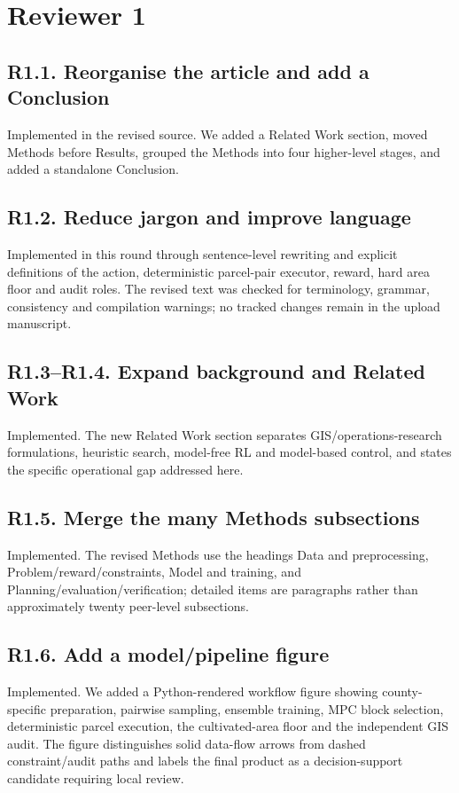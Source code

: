 ﻿\documentclass[11pt]{article}
\begin{document}
\section*{Reviewer 1}
\subsection*{R1.1. Reorganise the article and add a Conclusion}
Implemented in the revised source. We added a Related Work section, moved Methods before Results, grouped the Methods into four higher-level stages, and added a standalone Conclusion.

\subsection*{R1.2. Reduce jargon and improve language}
Implemented in this round through sentence-level rewriting and explicit definitions of the action, deterministic parcel-pair executor, reward, hard area floor and audit roles. The revised text was checked for terminology, grammar, consistency and compilation warnings; no tracked changes remain in the upload manuscript.

\subsection*{R1.3--R1.4. Expand background and Related Work}
Implemented. The new Related Work section separates GIS/operations-research formulations, heuristic search, model-free RL and model-based control, and states the specific operational gap addressed here.

\subsection*{R1.5. Merge the many Methods subsections}
Implemented. The revised Methods use the headings Data and preprocessing, Problem/reward/constraints, Model and training, and Planning/evaluation/verification; detailed items are paragraphs rather than approximately twenty peer-level subsections.

\subsection*{R1.6. Add a model/pipeline figure}
Implemented. We added a Python-rendered workflow figure showing county-specific preparation, pairwise sampling, ensemble training, MPC block selection, deterministic parcel execution, the cultivated-area floor and the independent GIS audit. The figure distinguishes solid data-flow arrows from dashed constraint/audit paths and labels the final product as a decision-support candidate requiring local review.
\end{document}
